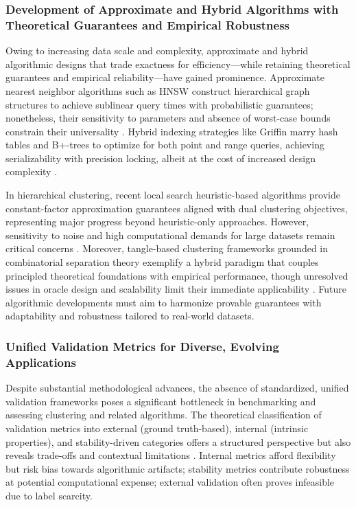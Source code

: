 \documentclass[11pt]{article}
\begin{document}
\subsubsection{Development of Approximate and Hybrid Algorithms with Theoretical Guarantees and Empirical Robustness}

Owing to increasing data scale and complexity, approximate and hybrid algorithmic designs that trade exactness for efficiency—while retaining theoretical guarantees and empirical reliability—have gained prominence. Approximate nearest neighbor algorithms such as HNSW construct hierarchical graph structures to achieve sublinear query times with probabilistic guarantees; nonetheless, their sensitivity to parameters and absence of worst-case bounds constrain their universality \cite{ref4}. Hybrid indexing strategies like Griffin marry hash tables and B+-trees to optimize for both point and range queries, achieving serializability with precision locking, albeit at the cost of increased design complexity \cite{ref35}.

In hierarchical clustering, recent local search heuristic-based algorithms provide constant-factor approximation guarantees aligned with dual clustering objectives, representing major progress beyond heuristic-only approaches. However, sensitivity to noise and high computational demands for large datasets remain critical concerns \cite{ref20}. Moreover, tangle-based clustering frameworks grounded in combinatorial separation theory exemplify a hybrid paradigm that couples principled theoretical foundations with empirical performance, though unresolved issues in oracle design and scalability limit their immediate applicability \cite{ref21}. Future algorithmic developments must aim to harmonize provable guarantees with adaptability and robustness tailored to real-world datasets.

\subsubsection{Unified Validation Metrics for Diverse, Evolving Applications}

Despite substantial methodological advances, the absence of standardized, unified validation frameworks poses a significant bottleneck in benchmarking and assessing clustering and related algorithms. The theoretical classification of validation metrics into external (ground truth-based), internal (intrinsic properties), and stability-driven categories offers a structured perspective but also reveals trade-offs and contextual limitations \cite{ref24}. Internal metrics afford flexibility but risk bias towards algorithmic artifacts; stability metrics contribute robustness at potential computational expense; external validation often proves infeasible due to label scarcity.
\end{document}
